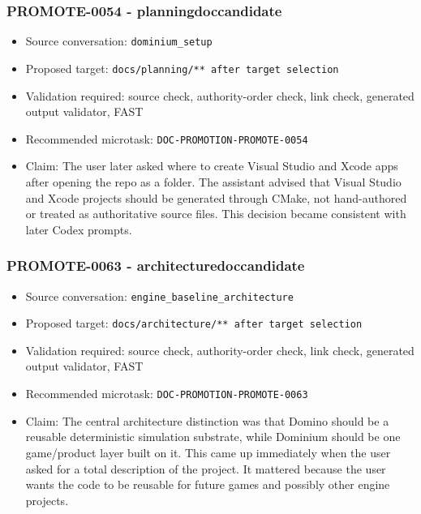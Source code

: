 \documentclass[9pt,a4paper,openany]{book}
\begin{document}
\subsubsection{PROMOTE-0054 - planningdoccandidate}

\begin{itemize}
\item Source conversation: \texttt{dominium\_\allowbreak{}setup}
\item Proposed target: \texttt{docs/\allowbreak{}planning/\allowbreak{}** after target selection}
\item Validation required: source check, authority-\allowbreak{}order check, link check, generated output validator, FAST
\item Recommended microtask: \texttt{DOC-\allowbreak{}PROMOTION-\allowbreak{}PROMOTE-\allowbreak{}0054}
\item Claim: The user later asked where to create Visual Studio and Xcode apps after opening the repo as a folder.\allowbreak{} The assistant advised that Visual Studio and Xcode projects should be generated through CMake, not hand-\allowbreak{}authored or treated as authoritative source files.\allowbreak{} This decision became consistent with later Codex prompts.\allowbreak{}
\end{itemize}

\subsubsection{PROMOTE-0063 - architecturedoccandidate}

\begin{itemize}
\item Source conversation: \texttt{engine\_\allowbreak{}baseline\_\allowbreak{}architecture}
\item Proposed target: \texttt{docs/\allowbreak{}architecture/\allowbreak{}** after target selection}
\item Validation required: source check, authority-\allowbreak{}order check, link check, generated output validator, FAST
\item Recommended microtask: \texttt{DOC-\allowbreak{}PROMOTION-\allowbreak{}PROMOTE-\allowbreak{}0063}
\item Claim: The central architecture distinction was that Domino should be a reusable deterministic simulation substrate, while Dominium should be one game/\allowbreak{}product layer built on it.\allowbreak{} This came up immediately when the user asked for a total description of the project.\allowbreak{} It mattered because the user wants the code to be reusable for future games and possibly other engine projects.\allowbreak{}
\end{itemize}
\end{document}
